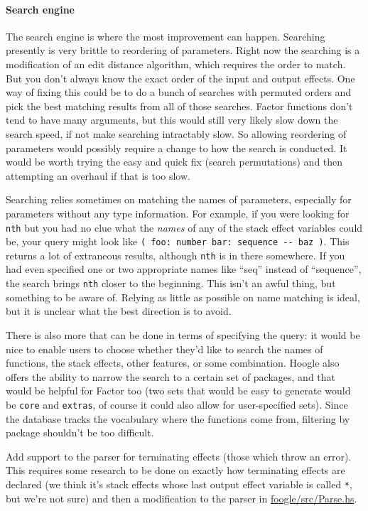 \documentclass[
]{article}
\begin{document}
\hypertarget{search-engine-1}{%
\paragraph{Search engine}\label{search-engine-1}}

The search engine is where the most improvement can happen. Searching
presently is very brittle to reordering of parameters. Right now the
searching is a modification of an edit distance algorithm, which
requires the order to match. But you don't always know the exact order
of the input and output effects. One way of fixing this could be to do a
bunch of searches with permuted orders and pick the best matching
results from all of those searches. Factor functions don't tend to have
many arguments, but this would still very likely slow down the search
speed, if not make searching intractably slow. So allowing reordering of
parameters would possibly require a change to how the search is
conducted. It would be worth trying the easy and quick fix (search
permutations) and then attempting an overhaul if that is too slow.

Searching relies sometimes on matching the names of parameters,
especially for parameters without any type information. For example, if
you were looking for \texttt{nth} but you had no clue what the
\emph{names} of any of the stack effect variables could be, your query
might look like \texttt{(\ foo:\ number\ bar:\ sequence\ -\/-\ baz\ )}.
This returns a lot of extraneous results, although \texttt{nth} is in
there somewhere. If you had even specified one or two appropriate names
like ``seq'' instead of ``sequence'', the search brings \texttt{nth}
closer to the beginning. This isn't an awful thing, but something to be
aware of. Relying as little as possible on name matching is ideal, but
it is unclear what the best direction is to avoid.

There is also more that can be done in terms of specifying the query: it
would be nice to enable users to choose whether they'd like to search
the names of functions, the stack effects, other features, or some
combination. Hoogle also offers the ability to narrow the search to a
certain set of packages, and that would be helpful for Factor too (two
sets that would be easy to generate would be \texttt{core} and
\texttt{extras}, of course it could also allow for user-specified sets).
Since the database tracks the vocabulary where the functions come from,
filtering by package shouldn't be too difficult.

Add support to the parser for terminating effects (those which throw an
error). This requires some research to be done on exactly how
terminating effects are declared (we think it's stack effects whose last
output effect variable is called \texttt{*}, but we're not sure) and
then a modification to the parser in
\href{https://github.com/factor-hmc/foogle/blob/master/src/Parse.hs}{foogle/src/Parse.hs}.
\end{document}
